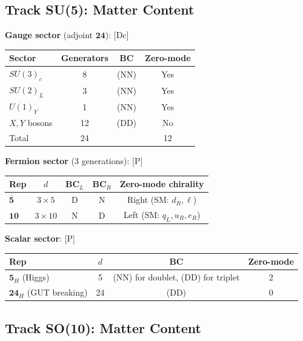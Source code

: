 \documentclass[11pt,a4paper]{article}
\newcommand{\tagDc}{\textcolor{blue!50!black}{[Dc]}}
\newcommand{\tagP}{\textcolor{green!50!black}{[P]}}
\begin{document}
\subsection{Track SU(5): Matter Content}

\begin{trackbox}
\textbf{Gauge sector} (adjoint $\mathbf{24}$): \tagDc
\begin{center}
\begin{tabular}{lccc}
\toprule
Sector & Generators & BC & Zero-mode \\
\midrule
$SU(3)_c$ & 8 & (NN) & Yes \\
$SU(2)_L$ & 3 & (NN) & Yes \\
$U(1)_Y$ & 1 & (NN) & Yes \\
$X, Y$ bosons & 12 & (DD) & No \\
\midrule
Total & 24 & & 12 \\
\bottomrule
\end{tabular}
\end{center}

\textbf{Fermion sector} (3 generations): \tagP
\begin{center}
\begin{tabular}{lcccc}
\toprule
Rep & $d$ & BC$_L$ & BC$_R$ & Zero-mode chirality \\
\midrule
$\bar{\mathbf{5}}$ & $3 \times 5$ & D & N & Right (SM: $d_R, \ell$) \\
$\mathbf{10}$ & $3 \times 10$ & N & D & Left (SM: $q_L, u_R, e_R$) \\
\bottomrule
\end{tabular}
\end{center}

\textbf{Scalar sector}: \tagP
\begin{center}
\begin{tabular}{lccc}
\toprule
Rep & $d$ & BC & Zero-mode \\
\midrule
$\mathbf{5}_H$ (Higgs) & 5 & (NN) for doublet, (DD) for triplet & 2 \\
$\mathbf{24}_H$ (GUT breaking) & 24 & (DD) & 0 \\
\bottomrule
\end{tabular}
\end{center}

\end{trackbox}

\subsection{Track SO(10): Matter Content}
\end{document}
